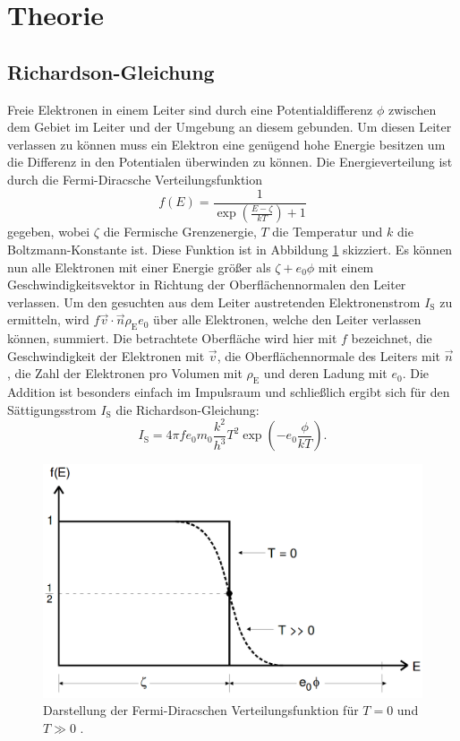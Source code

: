 
\section{Theorie}
\label{sec:Theorie}

\subsection{Richardson-Gleichung}
Freie Elektronen in einem Leiter sind durch eine Potentialdifferenz $\phi$ zwischen dem Gebiet im Leiter und der Umgebung an diesem gebunden. Um diesen Leiter verlassen zu können muss ein Elektron eine genügend hohe Energie besitzen um die Differenz in den Potentialen überwinden zu können. Die Energieverteilung ist durch die Fermi-Diracsche Verteilungsfunktion 
\begin{equation}
	f(E) = \frac{1}{\exp\left(\frac{E-\zeta}{k T}\right)+1}\label{eq:Fermi-Diracsche_Verteilungsfunktion}
\end{equation} 
gegeben, wobei $\zeta$ die Fermische Grenzenergie, $T$ die Temperatur und $k$ die Boltzmann-Konstante ist. Diese Funktion ist in Abbildung \ref{fig:Fermi-Diracsche} skizziert. Es können nun alle Elektronen mit einer Energie größer als $\zeta + e_0 \phi$ mit einem Geschwindigkeitsvektor in Richtung der Oberflächennormalen den Leiter verlassen. Um den gesuchten aus dem Leiter austretenden Elektronenstrom $I_\text{S}$ zu ermitteln, wird $f \vec{v}\cdot \vec{n} \rho_\text{E} e_0$ über alle Elektronen, welche den Leiter verlassen können, summiert. Die betrachtete Oberfläche wird hier mit $f$ bezeichnet, die Geschwindigkeit der Elektronen mit $\vec{v}$, die Oberflächennormale des Leiters mit $\vec{n}$ , die Zahl der Elektronen pro Volumen mit $\rho_\text{E}$ und deren Ladung mit $e_0$. Die Addition ist besonders einfach im Impulsraum und schließlich ergibt sich für den Sättigungsstrom $I_\text{S}$ die Richardson-Gleichung: 
\begin{equation}
	I_\text{S} = 4 \pi f e_0 m_0 \frac{k^2}{h^3} T^2 \exp\left(-e_0 \frac{\phi}{k T}\right)\text{.} \label{eq:Richardson-Gleichung}
\end{equation}
\begin{figure}
	\centering
	\includegraphics[width=\linewidth-100pt,height=\textheight-100pt,keepaspectratio]{content/Bilder/Fermi-Diracsche_Verteilung.png}
	\caption{Darstellung der Fermi-Diracschen Verteilungsfunktion für $T=0$ und $T\gg0$ \cite{V504}.}
	\label{fig:Fermi-Diracsche}
\end{figure}

